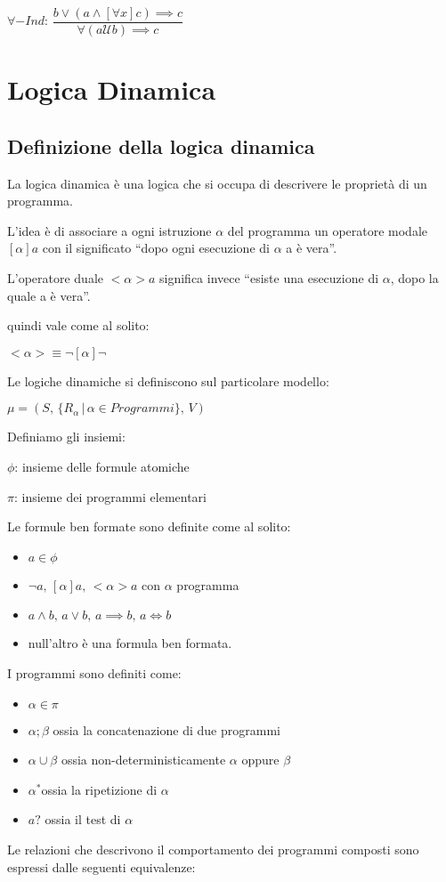 $\forall-Ind:\,\dfrac{b\vee(a\wedge[\forall x]c)\implies c}{\forall(a\mathcal{U}b)\implies c}$


\section{Logica Dinamica}


\subsection{Definizione della logica dinamica}

La logica dinamica è una logica che si occupa di descrivere le proprietà
di un programma.

L'idea è di associare a ogni istruzione $\alpha$ del programma un
operatore modale $[\alpha]a$ con il significato ``dopo ogni esecuzione
di $\alpha$ a è vera''.

L'operatore duale $<\alpha>a$ significa invece ``esiste una esecuzione
di $\alpha$, dopo la quale a è vera''.

quindi vale come al solito:

$<\alpha>\equiv\neg[\alpha]\neg$

Le logiche dinamiche si definiscono sul particolare modello:

$\mu=(S,\,\{R_{\alpha}\,|\,\alpha\in Programmi\},\, V)$

Definiamo gli insiemi:

$\phi$: insieme delle formule atomiche

$\pi$: insieme dei programmi elementari

Le formule ben formate sono definite come al solito:
\begin{itemize}
\item $a\in\phi$
\item $\neg a,\,[\alpha]a,\,<\alpha>a$ con $\alpha$ programma
\item $a\wedge b,\, a\vee b,\, a\implies b,\, a\iff b$
\item null'altro è una formula ben formata.
\end{itemize}
I programmi sono definiti come:
\begin{itemize}
\item $\alpha\in\pi$
\item $\alpha;\beta$ ossia la concatenazione di due programmi
\item $\alpha\cup\beta$ ossia non-deterministicamente $\alpha$ oppure
$\beta$
\item $\alpha^{*}$ossia la ripetizione di $\alpha$
\item $a?$ ossia il test di $\alpha$
\end{itemize}
Le relazioni che descrivono il comportamento dei programmi composti
sono espressi dalle seguenti equivalenze:

